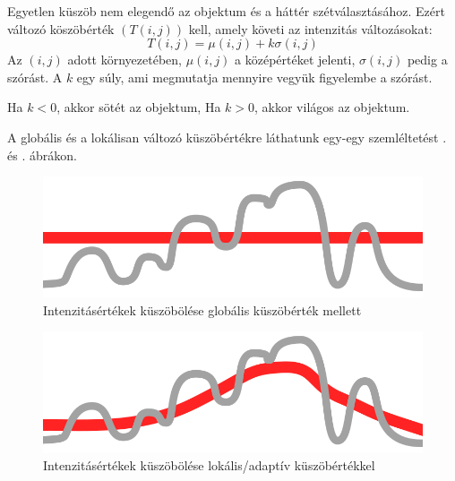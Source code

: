 

Egyetlen küszöb nem elegendő az objektum és a háttér szétválasztásához. Ezért változó köszöbérték $(T(i,j))$ kell, amely követi az intenzitás változásokat:
$$
T(i,j)=\mu(i, j) + k \sigma(i, j)
$$
Az $(i,j)$ adott környezetében, $\mu(i,j)$ a középértéket jelenti, $\sigma(i, j)$ pedig a szórást. A $k$ egy súly, ami megmutatja mennyire vegyük figyelembe a szórást.

Ha $k < 0$, akkor sötét az objektum,
Ha $k > 0$, akkor világos az objektum.

A globális és a lokálisan változó küszöbértékre láthatunk egy-egy szemléltetést . és . ábrákon.

\begin{figure}
\centering
\includegraphics[scale=0.5]{kepek/const_thresh.png}
\caption{Intenzitásértékek küszöbölése globális küszöbérték mellett}
\label{fig:const_thresh}
\end{figure}

\begin{figure}
\centering
\includegraphics[scale=0.5]{kepek/adaptive_thresh.png}
\caption{Intenzitásértékek küszöbölése lokális/adaptív küszöbértékkel}
\label{fig:adaptive_thresh}
\end{figure}

